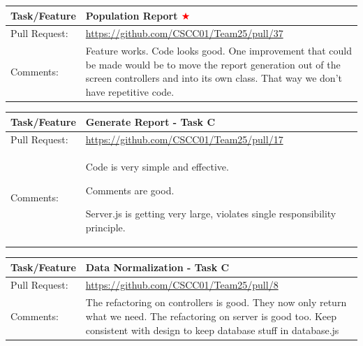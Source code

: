 \documentclass[12pt]{article}
\begin{document}
\begin{table}[H]
\begin{tabular}{|p{3cm}|p{11cm}|}
\hline
Task/Feature  & Population Report \textcolor{red}{$\bigstar$}
 \\ \hline
Pull Request: & \url{https://github.com/CSCC01/Team25/pull/37}                                                                                                                                                                                                                                                                                                                      \\ \hline
Comments:     & Feature works. Code looks good. One improvement that could be made would be to move the report generation out of the screen controllers and into its own class. That way we don’t have repetitive code. 
 \\ \hline
\end{tabular}
\end{table}

\begin{table}[H]
\begin{tabular}{|p{3cm}|p{11cm}|}
\hline
Task/Feature  & Generate Report - Task C
 \\ \hline
Pull Request: & \url{https://github.com/CSCC01/Team25/pull/17}                                                                                                                                                                                                                                                                                                                      \\ \hline
Comments:     & Code is very simple and effective. 

Comments are good.

Server.js is getting very large, violates single responsibility principle.
 \\ \hline
\end{tabular}
\end{table}

\begin{table}[H]
\begin{tabular}{|p{3cm}|p{11cm}|}
\hline
Task/Feature  & Data Normalization - Task C
 \\ \hline
Pull Request: & \url{https://github.com/CSCC01/Team25/pull/8}                                                                                                                                                                                                                                                                                                                      \\ \hline
Comments:     & The refactoring on controllers is good. They now only return what we need.
The refactoring on server is good too. Keep consistent with design to keep database stuff in database.js

 \\ \hline
\end{tabular}
\end{table}
\end{document}
